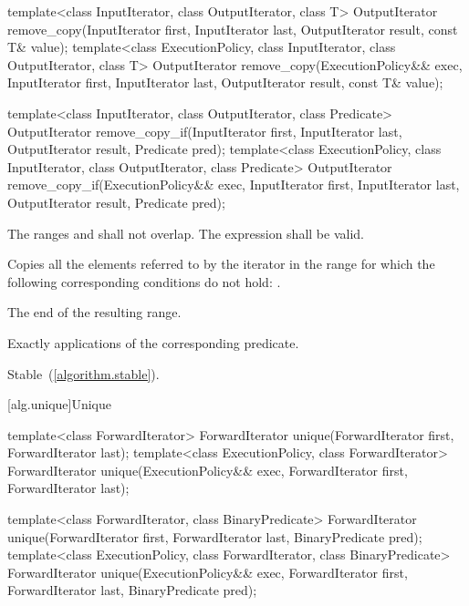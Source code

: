 %
%
\begin{itemdecl}
template<class InputIterator, class OutputIterator, class T>
  OutputIterator
    remove_copy(InputIterator first, InputIterator last,
                OutputIterator result, const T& value);
template<class ExecutionPolicy, class InputIterator, class OutputIterator, class T>
  OutputIterator
    remove_copy(ExecutionPolicy&& exec,
                InputIterator first, InputIterator last,
                OutputIterator result, const T& value);

template<class InputIterator, class OutputIterator, class Predicate>
  OutputIterator
    remove_copy_if(InputIterator first, InputIterator last,
                   OutputIterator result, Predicate pred);
template<class ExecutionPolicy, class InputIterator, class OutputIterator, class Predicate>
  OutputIterator
    remove_copy_if(ExecutionPolicy&& exec,
                   InputIterator first, InputIterator last,
                   OutputIterator result, Predicate pred);
\end{itemdecl}

\begin{itemdescr}
\pnum
\requires
The ranges
and
shall not overlap. The expression  shall be valid.

\pnum
\effects
Copies all the elements referred to by the iterator
in the range
for which the following corresponding conditions do not hold:
.

\pnum
\returns
The end of the resulting range.

\pnum
\complexity
Exactly
applications of the corresponding predicate.

\pnum
\remarks Stable~(\ref{algorithm.stable}).
\end{itemdescr}

[alg.unique]{Unique}

%
\begin{itemdecl}
template<class ForwardIterator>
  ForwardIterator unique(ForwardIterator first, ForwardIterator last);
template<class ExecutionPolicy, class ForwardIterator>
  ForwardIterator unique(ExecutionPolicy&& exec,
                         ForwardIterator first, ForwardIterator last);

template<class ForwardIterator, class BinaryPredicate>
  ForwardIterator unique(ForwardIterator first, ForwardIterator last,
                         BinaryPredicate pred);
template<class ExecutionPolicy, class ForwardIterator, class BinaryPredicate>
  ForwardIterator unique(ExecutionPolicy&& exec,
                         ForwardIterator first, ForwardIterator last,
                         BinaryPredicate pred);
\end{itemdecl}

